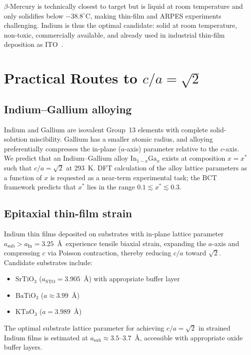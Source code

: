 \documentclass[aps,prl,twocolumn,superscriptaddress,floatfix]{revtex4-2}
\begin{document}
$\beta$-Mercury is technically closest to target but is liquid at room
temperature and only solidifies below $-38.8^\circ\mathrm{C}$, making
thin-film and ARPES experiments challenging.
Indium is thus the optimal candidate: solid at room temperature,
non-toxic, commercially available, and already used in industrial
thin-film deposition as ITO~\cite{wiki_indium}.

\section{Practical Routes to $c/a = \sqrt{2}$}

\subsection{Indium--Gallium alloying}

Indium and Gallium are isovalent Group~13 elements with complete
solid-solution miscibility.
Gallium has a smaller atomic radius, and alloying preferentially
compresses the in-plane ($a$-axis) parameter relative to the $c$-axis.
We predict that an Indium--Gallium alloy $\mathrm{In}_{1-x}\mathrm{Ga}_x$
exists at composition $x = x^*$ such that $c/a = \sqrt{2}$ at 293~K.
DFT calculation of the alloy lattice parameters as a function of $x$
is requested as a near-term experimental task; the BCT framework
predicts that $x^*$ lies in the range $0.1 \lesssim x^* \lesssim 0.3$.

\subsection{Epitaxial thin-film strain}

Indium thin films deposited on substrates with in-plane lattice
parameter $a_{\mathrm{sub}} > a_{\mathrm{In}} = 3.25$~\AA\ experience
tensile biaxial strain, expanding the $a$-axis and compressing $c$ via
Poisson contraction, thereby reducing $c/a$ toward $\sqrt{2}$.
Candidate substrates include:
\begin{itemize}
  \item $\mathrm{SrTiO}_3$ ($a_{\mathrm{STO}} = 3.905$~\AA) with
        appropriate buffer layer
  \item $\mathrm{BaTiO}_3$ ($a \approx 3.99$~\AA)
  \item $\mathrm{KTaO}_3$ ($a = 3.989$~\AA)
\end{itemize}
The optimal substrate lattice parameter for achieving $c/a = \sqrt{2}$
in strained Indium films is estimated at $a_{\mathrm{sub}} \approx
3.5$--$3.7$~\AA, accessible with appropriate oxide buffer layers.
\end{document}
